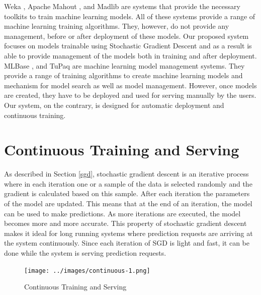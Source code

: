 \documentclass{vldb}
\begin{document}
Weka \cite{hall2009weka}, Apache Mahout \cite{Owen:2011:MA:2132656}, and Madlib \cite{hellerstein2012madlib} are systems that provide the necessary toolkits to train machine learning models. All of these systems provide a range of machine learning training algorithms. 
They, however, do not provide any management, before or after deployment of these models. 
Our proposed system focuses on models trainable using Stochastic Gradient Descent and as a result is able to provide management of the models both in training and after deployment.
MLBase \cite{kraska2013mlbase}, and TuPaq \cite{sparks2015tupaq} are machine learning model management systems.
They provide a range of training algorithms to create machine learning models and mechanism for model search as well as model management.
However, once models are created, they have to be deployed and used for serving manually by the users.
Our system, on the contrary, is designed for automatic deployment and continuous training.

\section{Continuous Training and Serving} \label{continious-training-serving}
As described in Section \ref{sgd}, stochastic gradient descent is an iterative process where in each iteration one or a sample of the data is selected randomly and the gradient is calculated based on this sample. 
After each iteration the parameters of the model are updated.
This means that at the end of an iteration, the model can be used to make predictions.
As more iterations are executed, the model becomes more and more accurate.
This property of stochastic gradient descent makes it ideal for long running systems where prediction requests are arriving at the system continuously.
Since each iteration of SGD is light and fast, it can be done while the system is serving prediction requests.
\begin{figure}[t]
\centering
\texttt{[image: ../images/continuous-1.png]}
\caption{Continuous Training and Serving}
\label{fig:cont-training-serving}
\end{figure}
\end{document}
